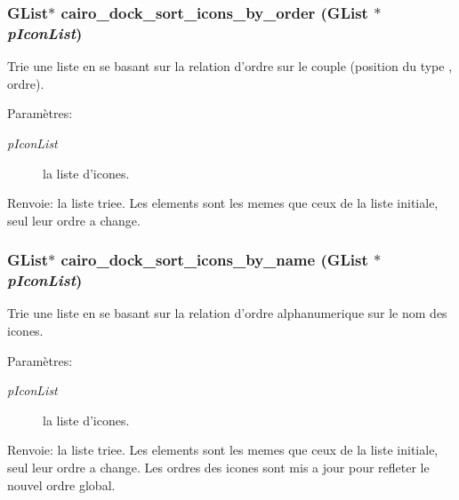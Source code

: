 \subsubsection{\setlength{\rightskip}{0pt plus 5cm}GList$\ast$ cairo\_\-dock\_\-sort\_\-icons\_\-by\_\-order (GList $\ast$ {\em p\-Icon\-List})}\label{cairo-dock-icons_8c_f1bef19a6b85b6a6e27feb40cefd400b}


Trie une liste en se basant sur la relation d'ordre sur le couple (position du type , ordre). \begin{Desc}
\item[Param\`{e}tres:]
\begin{description}
\item[{\em p\-Icon\-List}]la liste d'icones. \end{description}
\end{Desc}
\begin{Desc}
\item[Renvoie:]la liste triee. Les elements sont les memes que ceux de la liste initiale, seul leur ordre a change. \end{Desc}
\subsubsection{\setlength{\rightskip}{0pt plus 5cm}GList$\ast$ cairo\_\-dock\_\-sort\_\-icons\_\-by\_\-name (GList $\ast$ {\em p\-Icon\-List})}\label{cairo-dock-icons_8c_a78c3612a56f84f0e0765bd26c7510a4}


Trie une liste en se basant sur la relation d'ordre alphanumerique sur le nom des icones. \begin{Desc}
\item[Param\`{e}tres:]
\begin{description}
\item[{\em p\-Icon\-List}]la liste d'icones. \end{description}
\end{Desc}
\begin{Desc}
\item[Renvoie:]la liste triee. Les elements sont les memes que ceux de la liste initiale, seul leur ordre a change. Les ordres des icones sont mis a jour pour refleter le nouvel ordre global. \end{Desc}
